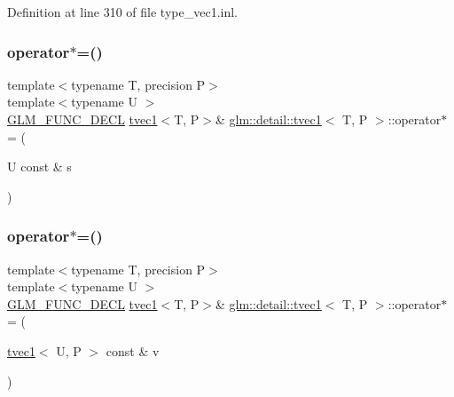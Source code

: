 Definition at line 310 of file type\+\_\+vec1.\+inl.

\mbox{\label{structglm_1_1detail_1_1tvec1_a7ca0f64a6ab86fa34d4b5f23a9db58d2}} 
\subsubsection{\texorpdfstring{operator$\ast$=()}{operator*=()}\hspace{0.1cm}{\footnotesize\ttfamily [1/4]}}
{\footnotesize\ttfamily template$<$typename T, precision P$>$ \\
template$<$typename U $>$ \\
\hyperlink{setup_8hpp_ab2d052de21a70539923e9bcbf6e83a51}{G\+L\+M\+\_\+\+F\+U\+N\+C\+\_\+\+D\+E\+CL} \hyperlink{structglm_1_1detail_1_1tvec1}{tvec1}$<$T, P$>$\& \hyperlink{structglm_1_1detail_1_1tvec1}{glm\+::detail\+::tvec1}$<$ T, P $>$\+::operator$\ast$= (\begin{DoxyParamCaption}\item[{U const \&}]{s }\end{DoxyParamCaption})}

\mbox{\label{structglm_1_1detail_1_1tvec1_ada2594a8dd2c0ec4e9a20ec18469668c}} 
\subsubsection{\texorpdfstring{operator$\ast$=()}{operator*=()}\hspace{0.1cm}{\footnotesize\ttfamily [2/4]}}
{\footnotesize\ttfamily template$<$typename T, precision P$>$ \\
template$<$typename U $>$ \\
\hyperlink{setup_8hpp_ab2d052de21a70539923e9bcbf6e83a51}{G\+L\+M\+\_\+\+F\+U\+N\+C\+\_\+\+D\+E\+CL} \hyperlink{structglm_1_1detail_1_1tvec1}{tvec1}$<$T, P$>$\& \hyperlink{structglm_1_1detail_1_1tvec1}{glm\+::detail\+::tvec1}$<$ T, P $>$\+::operator$\ast$= (\begin{DoxyParamCaption}\item[{\hyperlink{structglm_1_1detail_1_1tvec1}{tvec1}$<$ U, P $>$ const \&}]{v }\end{DoxyParamCaption})}

